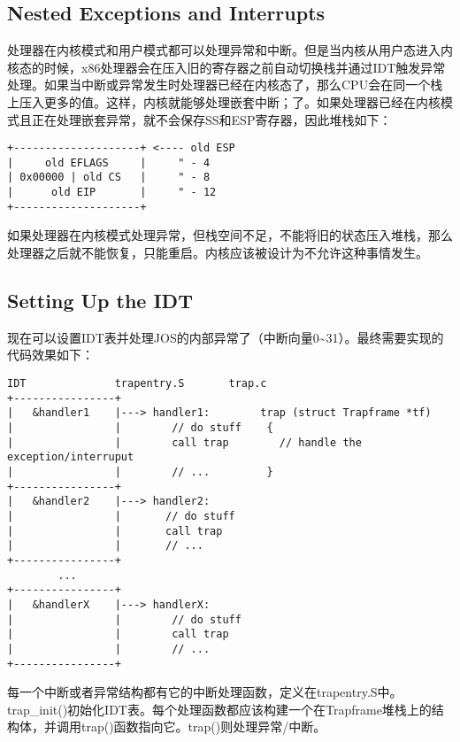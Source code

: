 \subsection{Nested Exceptions and Interrupts}
\par 处理器在内核模式和用户模式都可以处理异常和中断。但是当内核从用户态进入内核态的时候，x86处理器会在压入旧的寄存器之前自动切换栈并通过IDT触发异常处理。如果当中断或异常发生时处理器已经在内核态了，那么CPU会在同一个栈上压入更多的值。这样，内核就能够处理嵌套中断；了。如果处理器已经在内核模式且正在处理嵌套异常，就不会保存SS和ESP寄存器，因此堆栈如下：
\begin{lstlisting}[numbers=none]
+--------------------+ <---- old ESP
|     old EFLAGS     |     " - 4
| 0x00000 | old CS   |     " - 8
|      old EIP       |     " - 12
+--------------------+
\end{lstlisting}
\par 如果处理器在内核模式处理异常，但栈空间不足，不能将旧的状态压入堆栈，那么处理器之后就不能恢复，只能重启。内核应该被设计为不允许这种事情发生。

\subsection{Setting Up the IDT}
\par 现在可以设置IDT表并处理JOS的内部异常了（中断向量0\textasciitilde 31）。最终需要实现的代码效果如下：
\begin{lstlisting}[numbers=none]
       IDT              trapentry.S       trap.c
+----------------+
|   &handler1    |---> handler1:        trap (struct Trapframe *tf)
|                |        // do stuff    {
|                |        call trap        // handle the exception/interruput
|                |        // ...         }
+----------------+
|   &handler2    |---> handler2:
|                |       // do stuff
|                |       call trap
|                |       // ...
+----------------+
        ...
+----------------+
|   &handlerX    |---> handlerX:
|                |        // do stuff
|                |        call trap
|                |        // ...
+----------------+
\end{lstlisting}
\par 每一个中断或者异常结构都有它的中断处理函数，定义在trapentry.S中。trap\_init()初始化IDT表。每个处理函数都应该构建一个在Trapframe堆栈上的结构体，并调用trap()函数指向它。trap()则处理异常/中断。

